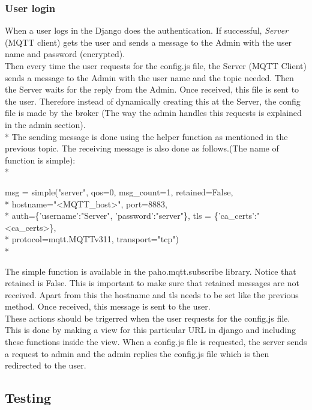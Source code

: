 \documentclass{report}
\begin{document}
\subsubsection{User login}
When a user logs in the Django does the authentication. If successful, \textit{Server} (MQTT client) gets the user and sends a message to the Admin with the user name and password (encrypted).\\

Then every time the user requests for the config.js file, the Server (MQTT Client) sends a message to the Admin with the user name and the topic needed. Then the Server waits for the reply from the Admin. Once received, this file is sent to the user. Therefore instead of dynamically creating this at the Server, the config file is made by the broker (The way the admin handles this requests is explained in the admin section).\\*
The sending message is done using the helper function as mentioned in the previous topic. The receiving message is also done as follows.(The name of function is simple):\\*

msg = simple("server", qos=0, msg\_count=1, retained=False,\\*
\hspace*{1cm}hostname="<MQTT\_host>", port=8883,\\*
\hspace*{1cm}auth=\{'username':"Server", 'password':"server"\}, tls = \{'ca\_certs':"<ca\_certs>\},\\*
\hspace*{1cm}protocol=mqtt.MQTTv311, transport="tcp")\\*

The simple function is available in the paho.mqtt.subscribe library. Notice that retained is False. This is important to make sure that retained messages are not received. Apart from this the hostname and tls needs to be set like the previous method. Once received, this message is sent to the user.\\

These actions should be trigerred when the user requests for the config.js file. This is done by making a view for this particular URL in django and including these functions inside the view. When a config.js file is requested, the server sends a request to admin and the admin replies the config.js file which is then redirected to the user.


\subsection{Testing}                %
\end{document}
